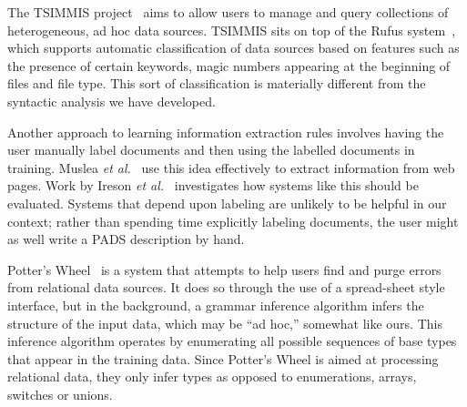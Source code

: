 The TSIMMIS project~\cite{chawathe+:tsimmis} aims to
allow users to manage and query collections of heterogeneous, ad hoc
data sources.  TSIMMIS sits on top of the Rufus
system~\cite{shoens+:rufus}, which supports automatic classification
of data sources based on features such as the presence of certain
keywords, magic numbers appearing at the beginning of files and file
type.  
This sort of classification is materially
different from the syntactic analysis we have developed.

Another approach to learning information extraction rules involves
having the user manually label documents and then using the labelled
documents in training.  Muslea {\em et al.}~\cite{muslea+:active-learning} 
use this idea effectively to extract information from web pages.  Work by 
Ireson {\em et al.}~\cite{ireson+:ml-evaluation} investigates how systems 
like this should be evaluated.  Systems that depend upon labeling
are unlikely to be helpful in our context; rather than spending 
time explicitly labeling documents, the user might as well write a 
PADS description by hand.



Potter's Wheel~\cite{raman+:potterwheel} is a system that attempts to
help users find and purge errors from
relational data sources.  It does so through the use of a spread-sheet
style interface, but in the background, a grammar inference algorithm
infers the structure of the input data, which may be ``ad hoc,'' 
somewhat like ours.  This inference algorithm operates by
enumerating all possible sequences of base types that appear
in the training data.  
Since Potter's Wheel is aimed at processing
relational data, they only infer  types
as opposed to enumerations, arrays, switches or unions.  

